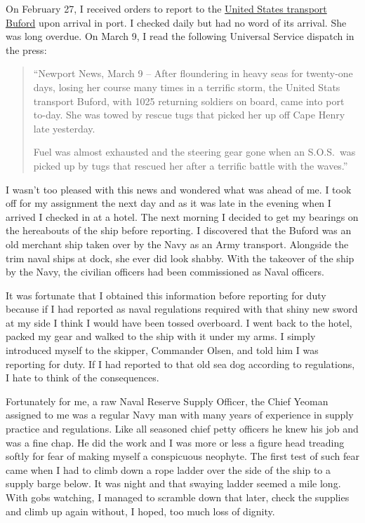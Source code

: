 \documentclass[12pt]{book}              %
\begin{document}
On February 27, I received orders to report to the \href{http://en.wikipedia.org/wiki/USAT_Buford}{United States transport Buford} upon arrival in port. I checked daily but had no word of its arrival. She was long overdue. On March 9, I read the following Universal Service dispatch in the press:

\begin{quote}
``Newport News, March 9 -- After floundering in heavy seas for twenty-one days, losing her course many times in a terrific storm, the United Stats transport Buford, with 1025 returning soldiers on board, came into port to-day. She was towed by rescue tugs that picked her up off Cape Henry late yesterday. 

Fuel was almost exhausted and the steering gear gone when an S.O.S.~was picked up by tugs that rescued her after a terrific battle with the waves.''
\end{quote}

I wasn't too pleased with this news and wondered what was ahead of me. I took off for my assignment the next day and as it was late in the evening when I arrived I checked in at a hotel. The next morning I decided to get my bearings on the hereabouts of the ship before reporting. I discovered that the Buford was an old merchant ship taken over by the Navy as an Army transport. Alongside the trim naval ships at dock, she ever did look shabby. With the takeover of the ship by the Navy, the civilian officers had been commissioned as Naval officers. 

It was fortunate that I obtained this information before reporting for duty because if I had reported as naval regulations required with that shiny new sword at my side I think I would have been tossed overboard. I went back to the hotel, packed my gear and walked to the ship with it under my arms. I simply introduced myself to the skipper, Commander Olsen, and told him I was reporting for duty. If I had reported to that old sea dog according to regulations, I hate to think of the consequences.

Fortunately for me, a raw Naval Reserve Supply Officer, the Chief Yeoman assigned to me was a regular Navy man with many years of experience in supply practice and regulations. Like all seasoned chief petty officers he knew his job and was a fine chap. He did the work and I was more or less a figure head treading softly for fear of making myself a conspicuous neophyte. The first test of such fear came when I had to climb down a rope ladder over the side of the ship to a supply barge below. It was night and that swaying ladder seemed a mile long. With gobs watching, I managed to scramble down that later, check the supplies and climb up again without, I hoped, too much loss of dignity. 
\end{document}
